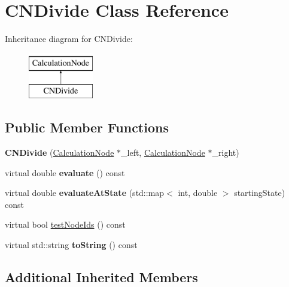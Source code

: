 \hypertarget{classCNDivide}{}\section{C\+N\+Divide Class Reference}
\label{classCNDivide}
Inheritance diagram for C\+N\+Divide\+:\begin{figure}[H]
\begin{center}
\leavevmode
\includegraphics[height=2.000000cm]{classCNDivide}
\end{center}
\end{figure}
\subsection*{Public Member Functions}
\begin{DoxyCompactItemize}
\item 
{\bfseries C\+N\+Divide} (\hyperlink{classCalculationNode}{Calculation\+Node} $\ast$\+\_\+left, \hyperlink{classCalculationNode}{Calculation\+Node} $\ast$\+\_\+right)\hypertarget{classCNDivide_afeb9424f787f42ebf0edb7926a0e80fd}{}\label{classCNDivide_afeb9424f787f42ebf0edb7926a0e80fd}

\item 
virtual double {\bfseries evaluate} () const \hypertarget{classCNDivide_a416c36cec11a481a20bbe3409c1e42db}{}\label{classCNDivide_a416c36cec11a481a20bbe3409c1e42db}

\item 
virtual double {\bfseries evaluate\+At\+State} (std\+::map$<$ int, double $>$ starting\+State) const \hypertarget{classCNDivide_a77752426072bc2bda3b0ca4fdc03f871}{}\label{classCNDivide_a77752426072bc2bda3b0ca4fdc03f871}

\item 
virtual bool \hyperlink{classCNDivide_a411f954df8b87778f20058ce6601d3f8}{test\+Node\+Ids} () const 
\item 
virtual std\+::string {\bfseries to\+String} () const \hypertarget{classCNDivide_a301fb85c372986362aa6b4930f0d79c5}{}\label{classCNDivide_a301fb85c372986362aa6b4930f0d79c5}

\end{DoxyCompactItemize}
\subsection*{Additional Inherited Members}


